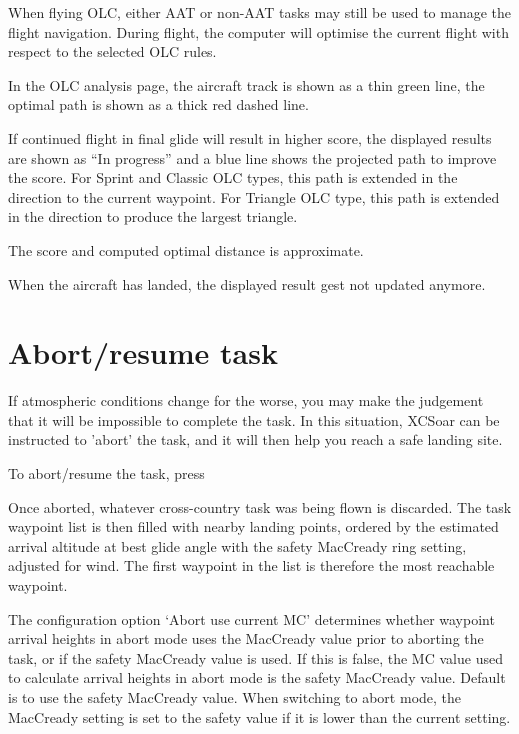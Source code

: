 \documentclass[a4paper,12pt]{refrep}
\begin{document}
When flying OLC, either AAT or non-AAT tasks may still be used to
manage the flight navigation.  During flight, the computer will optimise the
current flight with respect to the selected OLC rules.  

In the OLC analysis page, the aircraft track is shown as a thin green line, the optimal 
path is shown as a thick red dashed line.

If continued flight in final glide will result in higher score, the displayed
results are shown as ``In progress'' and a blue line shows the projected path 
to improve the score. For Sprint and Classic OLC types, this path is extended in the direction 
to the current waypoint. For Triangle OLC type, this path is extended in the direction to 
produce the largest triangle. 

The score and computed optimal distance is approximate.


When the aircraft has landed, the displayed result gest not updated anymore.


\section{Abort/resume task}

If atmospheric conditions change for the worse, you may make the
judgement that it will be impossible to complete the task.  In this
situation, XCSoar can be instructed to 'abort' the task, and it will
then help you reach a safe landing site.

To abort/resume the task, press
\begin{quote}
\blink{}\blink{}
\end{quote}

Once aborted, whatever cross-country task was being flown is
discarded.  The task waypoint list is then filled with nearby landing
points, ordered by the estimated arrival altitude at best glide angle
with the safety MacCready ring setting, adjusted for wind.  The
first waypoint in the list is therefore the most reachable waypoint.

The configuration option `Abort use current MC' determines whether
waypoint arrival heights in abort mode uses the MacCready value prior
to aborting the task, or if the safety MacCready value is used.  If
this is false, the MC value used to calculate arrival heights in abort
mode is the safety MacCready value.  Default is to use the safety
MacCready value.  When switching to abort mode, the MacCready setting
is set to the safety value if it is lower than the current setting.
\end{document}
